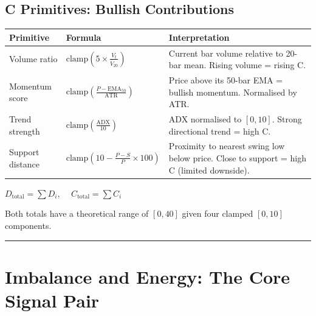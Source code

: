 \documentclass[12pt]{article}
\begin{document}
\subsection{C Primitives: Bullish Contributions}\label{c-primitives-bullish-contributions}

\begin{longtable}[]{@{}
  >{\raggedright\arraybackslash}p{}
  >{\raggedright\arraybackslash}p{}
  >{\raggedright\arraybackslash}p{}@{}}
\toprule\noalign{}
\begin{minipage}[b]{\linewidth}\raggedright
Primitive
\end{minipage} & \begin{minipage}[b]{\linewidth}\raggedright
Formula
\end{minipage} & \begin{minipage}[b]{\linewidth}\raggedright
Interpretation
\end{minipage} \\
\midrule\noalign{}
\endhead
\bottomrule\noalign{}
\endlastfoot
Volume ratio &
\(\text{clamp}\!\left(5 \times \frac{V_t}{\bar{V}_{20}}\right)\) &
Current bar volume relative to 20-bar mean. Rising volume = rising C. \\
Momentum score &
\(\text{clamp}\!\left(\frac{P - \text{EMA}_{50}}{\text{ATR}}\right)\) &
Price above its 50-bar EMA = bullish momentum. Normalised by ATR. \\
Trend strength & \(\text{clamp}\!\left(\frac{\text{ADX}}{10}\right)\) &
ADX normalised to \([0, 10]\). Strong directional trend = high C. \\
Support distance &
\(\text{clamp}\!\left(10 - \frac{P - S}{P} \times 100\right)\) &
Proximity to nearest swing low below price. Close to support = high C
(limited downside). \\
\end{longtable}

\(D_{\text{total}} = \sum D_i\), \(\quad C_{\text{total}} = \sum C_i\)

Both totals have a theoretical range of \([0, 40]\) given four clamped
\([0, 10]\) components.

\begin{center}\rule{0.5\linewidth}{0.5pt}\end{center}

\section{Imbalance and Energy: The Core Signal Pair}\label{imbalance-and-energy-the-core-signal-pair}
\end{document}
